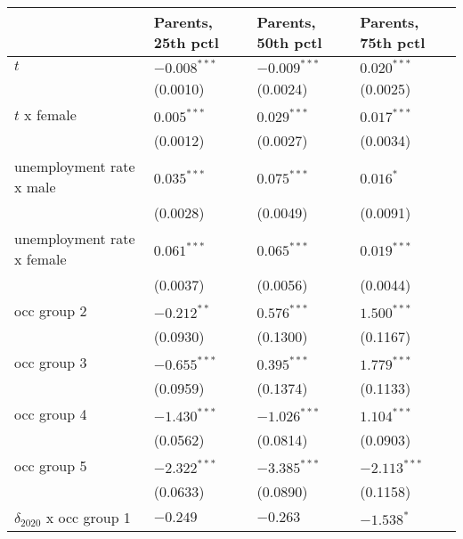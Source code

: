 \begin{tabular}{llll}
\toprule
{} & Parents, 25th pctl & Parents, 50th pctl & Parents, 75th pctl \\
\midrule
$t$                                    &     $-0.008^{***}$ &     $-0.009^{***}$ &      $0.020^{***}$ \\
                                       &           (0.0010) &           (0.0024) &           (0.0025) \\
$t$ x female                           &      $0.005^{***}$ &      $0.029^{***}$ &      $0.017^{***}$ \\
                                       &           (0.0012) &           (0.0027) &           (0.0034) \\
unemployment rate x male               &      $0.035^{***}$ &      $0.075^{***}$ &          $0.016^*$ \\
                                       &           (0.0028) &           (0.0049) &           (0.0091) \\
unemployment rate x female             &      $0.061^{***}$ &      $0.065^{***}$ &      $0.019^{***}$ \\
                                       &           (0.0037) &           (0.0056) &           (0.0044) \\
occ group 2                            &      $-0.212^{**}$ &      $0.576^{***}$ &      $1.500^{***}$ \\
                                       &           (0.0930) &           (0.1300) &           (0.1167) \\
occ group 3                            &     $-0.655^{***}$ &      $0.395^{***}$ &      $1.779^{***}$ \\
                                       &           (0.0959) &           (0.1374) &           (0.1133) \\
occ group 4                            &     $-1.430^{***}$ &     $-1.026^{***}$ &      $1.104^{***}$ \\
                                       &           (0.0562) &           (0.0814) &           (0.0903) \\
occ group 5                            &     $-2.322^{***}$ &     $-3.385^{***}$ &     $-2.113^{***}$ \\
                                       &           (0.0633) &           (0.0890) &           (0.1158) \\
$\delta_{2020}$ x occ group 1          &           $-0.249$ &           $-0.263$ &         $-1.538^*$ \\

\end{tabular}
